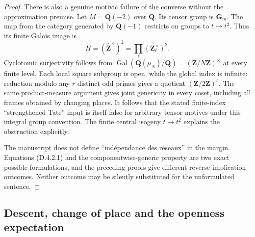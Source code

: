 \begin{proof}
There is also a genuine motivic failure of the converse without the
approximation premise. Let \(M=\mathbf Q(-2)\) over \(\mathbf Q\).
Its tensor group is \(\mathbf G_m\). The map from the category
generated by \(\mathbf Q(-1)\) restricts on groups to
\(t\mapsto t^2\). Thus its finite Galois image is
\[
H=(\widehat{\mathbf Z}^{\times})^2
=\prod_\ell(\mathbf Z_\ell^\times)^2.
\tag{D.4.2.2}
\]
Cyclotomic surjectivity follows from
\(\operatorname{Gal}(\mathbf Q(\mu_N)/\mathbf Q)
=(\mathbf Z/N\mathbf Z)^\times\) at every finite level. Each local
square subgroup is open, while the global index is infinite:
reduction modulo any \(r\) distinct odd primes gives a quotient
\((\mathbf Z/2\mathbf Z)^r\). The same product-measure argument
gives joint genericity in every coset, including all frames obtained
by changing places. It follows that the stated finite-index
``strengthened Tate'' input is itself false for arbitrary tensor
motives under this integral group convention. The finite central
isogeny \(t\mapsto t^2\) explains the obstruction explicitly.

The manuscript does not define ``indépendance des réseaux'' in the
margin. Equations (D.4.2.1) and the componentwise-generic property
are two exact possible formulations, and the preceding proofs give
different reverse-implication outcomes. Neither outcome may be
silently substituted for the unformulated sentence.
\end{proof}

\subsection{Descent, change of place and the openness expectation}

